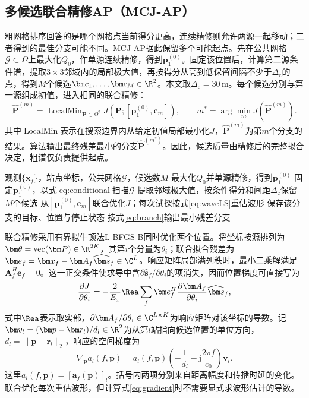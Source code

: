 \subsection{多候选联合精修AP（MCJ-AP）}\label{sec:mcj}
粗网格排序回答的是哪个网格点当前得分更高，连续精修则允许两源一起移动；二者得到的最佳分支可能不同。MCJ-AP据此保留多个可能起点。先在公共网格$\mathcal G\subset\Omega$上最大化$Q_0$，作单源连续精修，得到$\bm p_1^{(0)}$。固定该位置后，计算第二源条件谱，提取$3\times3$邻域内的局部极大值，再按得分从高到低保留间隔不少于$\Delta_{\mathrm c}$的点，得到$M$个候选$\bm c_1,\ldots,\bm c_M\in\R^2$。本文取$\Delta_{\mathrm c}=30$\,m。每个候选分别与第一源组成初值，进入相同的联合精修：
\begin{equation}
 \widehat{\bm P}^{(m)}=\operatorname{LocalMin}_{\bm P\in\Omega^2}
 J(\bm P;[\bm p_1^{(0)},\bm c_m]),\qquad
 m^*=\arg\min_m J(\widehat{\bm P}^{(m)}).\label{eq:branch}
\end{equation}
其中$\operatorname{LocalMin}$表示在搜索边界内从给定初值局部最小化$J$，$\widehat{\bm P}^{(m)}$为第$m$个分支的结果。算法输出最终残差最小的分支$\widehat{\bm P}^{(m^*)}$。因此，候选质量由精修后的完整拟合决定，粗谱仅负责提供起点。

\begin{algorithm}[H]
\caption{多候选联合精修AP}\label{alg:ap}
\begin{algorithmic}[1]
\Require 观测$\{\bm x_f\}$，站点坐标，公共网格$\mathcal G$，候选数$M$
\State 最大化$Q_0$并单源精修，得到$\bm p_1^{(0)}$
\State 固定$\bm p_1^{(0)}$，以式\eqref{eq:conditional}扫描$\mathcal G$
\State 提取邻域极大值，按条件得分和间距$\Delta_{\mathrm c}$保留$M$个候选
  \State 从$[\bm p_1^{(0)},\bm c_m]$联合优化$J$；每次试探按式\eqref{eq:waveLS}重估波形
  \State 保存该分支的目标、位置与停止状态
\EndFor
\State 按式\eqref{eq:branch}输出最小残差分支
\end{algorithmic}
\end{algorithm}

联合精修采用有界拟牛顿法L-BFGS-B同时优化两个位置\cite{Byrd1995}。将坐标按源排列为$\bm\theta=\operatorname{vec}(\bm P)\in\R^{2K}$，其第$i$个分量为$\theta_i$；联合拟合残差为$\bm e_f=\bm x_f-\bm A_f\widehat{\bm s}_f\in\C^L$。响应矩阵局部满列秩时，最小二乘解满足$\bm A_f^H\bm e_f=0$。这一正交条件使求导中含$\partial\widehat{\bm s}_f/\partial\theta_i$的项消失，因而位置梯度可直接写为\cite{GolubPereyra1973}
\begin{equation}
 \frac{\partial J}{\partial\theta_i}
 =-\frac{2}{E_x}\Rea\sum_f
 \bm e_f^H\frac{\partial\bm A_f}{\partial\theta_i}
 \widehat{\bm s}_f,\label{eq:gradient}
\end{equation}
式中$\Rea$表示取实部，$\partial\bm A_f/\partial\theta_i\in\C^{L\times K}$为响应矩阵对该坐标的导数。记$\bm v_l=(\bm p-\bm r_l)/d_l\in\R^2$为从第$l$站指向候选位置的单位方向，$d_l=\|\bm p-\bm r_l\|_2$，响应的空间梯度为
\begin{equation}
 \nabla_{\bm p}a_l(f,\bm p)
 =a_l(f,\bm p)\left(-\frac1{d_l}-\mathrm j\frac{2\pi f}{c_0}\right)\bm v_l.
 \label{eq:responseDerivative}
\end{equation}
这里$a_l(f,\bm p)=[\bm a_f(\bm p)]_l$。括号内两项分别来自距离幅度和传播时延的变化。联合优化每次重估波形，但计算式\eqref{eq:gradient}时不需要显式求波形估计的导数。

